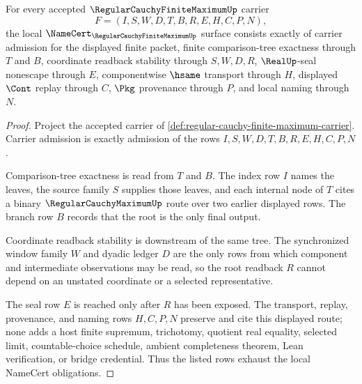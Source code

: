 \begin{theorem}
\label{thm:regular-cauchy-finite-maximum-namecert-obligations}
For every accepted $\RegularCauchyFiniteMaximumUp$ carrier
$$
F=(I,S,W,D,T,B,R,E,H,C,P,N),
$$
the local $\NameCert_{\RegularCauchyFiniteMaximumUp}$ surface consists exactly of carrier admission for the displayed finite packet, finite comparison-tree exactness through $T$ and $B$, coordinate readback stability through $S,W,D,R$, $\RealUp$-seal nonescape through $E$, componentwise $\hsame$ transport through $H$, displayed $\Cont$ replay through $C$, $\Pkg$ provenance through $P$, and local naming through $N$.
\end{theorem}
\begin{proof}
Project the accepted carrier of \autoref{def:regular-cauchy-finite-maximum-carrier}. Carrier admission is exactly admission of the rows $I,S,W,D,T,B,R,E,H,C,P,N$.

Comparison-tree exactness is read from $T$ and $B$. The index row $I$ names the leaves, the source family $S$ supplies those leaves, and each internal node of $T$ cites a binary $\RegularCauchyMaximumUp$ route over two earlier displayed rows. The branch row $B$ records that the root is the only final output.

Coordinate readback stability is downstream of the same tree. The synchronized window family $W$ and dyadic ledger $D$ are the only rows from which component and intermediate observations may be read, so the root readback $R$ cannot depend on an unstated coordinate or a selected representative.

The seal row $E$ is reached only after $R$ has been exposed. The transport, replay, provenance, and naming rows $H,C,P,N$ preserve and cite this displayed route; none adds a host finite supremum, trichotomy, quotient real equality, selected limit, countable-choice schedule, ambient completeness theorem, Lean verification, or bridge credential. Thus the listed rows exhaust the local NameCert obligations.
\end{proof}

